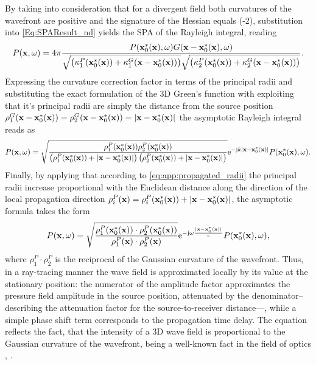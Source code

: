 By taking into consideration that for a divergent field both curvatures of the wavefront are positive and the signature of the Hessian equals (-2), substitution into \eqref{Eq:SPAResult_nd} yields the SPA of the Rayleigh integral, reading
\begin{equation}
\label{eq:HF_approx:asymptotic_rayleigh}
P(\mathbf{x},\omega) = 4\pi \frac{P(\mathbf{x}_0^*(\mathbf{x}),\omega) G(\mathbf{x}-\mathbf{x}_0^*(\mathbf{x}),\omega)}
{
\sqrt{\left(\kappa_1^P(\mathbf{x}_0^*(\mathbf{x})) + \kappa_1^G(\mathbf{x}-\mathbf{x}_0^*(\mathbf{x}))\right)}
\sqrt{\left(\kappa_2^P(\mathbf{x}_0^*(\mathbf{x})) + \kappa_2^G(\mathbf{x}-\mathbf{x}_0^*(\mathbf{x}))\right)}
}.
\end{equation}
Expressing the curvature correction factor in terms of the principal radii and substituting the exact formulation of the 3D Green's function with exploiting that it's principal radii are simply the distance from the source position $\rho_1^G(\mathbf{x}-\mathbf{x}_0^*(\mathbf{x})) = \rho_2^G(\mathbf{x}-\mathbf{x}_0^*(\mathbf{x})) = |\mathbf{x}-\mathbf{x}_0^*(\mathbf{x})|$ the asymptotic Rayleigh integral reads as
\begin{equation}
\label{eq:HF_approx:ray_propagation_a}
\small
P(\mathbf{x},\omega) =
\sqrt{ \frac{ \rho_1^P(\mathbf{x}_0^*(\mathbf{x})) \rho_2^P(\mathbf{x}_0^*(\mathbf{x})) }{ \left(\rho_1^P(\mathbf{x}_0^*(\mathbf{x})) + |\mathbf{x}-\mathbf{x}_0^*(\mathbf{x})| \right) \left(\rho_2^P(\mathbf{x}_0^*(\mathbf{x})) + |\mathbf{x}-\mathbf{x}_0^*(\mathbf{x})|\right) } }
\mathrm{e}^{-\mathrm{j} k |\mathbf{x}-\mathbf{x}_0^*(\mathbf{x})| } P(\mathbf{x}_0^*(\mathbf{x}),\omega) .
\end{equation}
Finally, by applying that according to \eqref{eq:app:propagated_radii} the principal radii increase proportional with the Euclidean distance along the direction of the local propagation direction $\rho_i^P(\mathbf{x}) = \rho_i^P(\mathbf{x}_0^*(\mathbf{x})) + |\mathbf{x}-\mathbf{x}_0^*(\mathbf{x})|$, the asymptotic formula takes the form
\begin{equation}
\label{eq:HF_approx:ray_propagation}
P(\mathbf{x},\omega) =
\sqrt{ \frac{ \rho_1^P(\mathbf{x}_0^*(\mathbf{x})) \cdot \rho_2^P(\mathbf{x}_0^*(\mathbf{x})) }{ \rho^P_1(\mathbf{x}) \cdot \rho^P_2(\mathbf{x}) } }
\mathrm{e}^{-\mathrm{j} \omega \frac{|\mathbf{x}-\mathbf{x}_0^*(\mathbf{x})| }{c} } P(\mathbf{x}_0^*(\mathbf{x}),\omega),
\end{equation}
where $\rho^P_1 \cdot \rho^P_2$ is the reciprocal of the Gaussian curvature of the wavefront.
Thus, in a ray-tracing manner the wave field is approximated locally by its value at the stationary position: 
the numerator of the amplitude factor approximates the pressure field amplitude in the source position, attenuated by the denominator--describing the attenuation factor for the source-to-receiver distance---, while a simple phase shift term corresponds to the propagation time delay.
The equation reflects the fact, that the intensity of a 3D wave field is proportional to the Gaussian curvature of the wavefront, being a well-known fact in the field of optics \cite[Sec. 3.1]{Born1970}, \cite[Sec. 1.3]{Bouche1997}.


